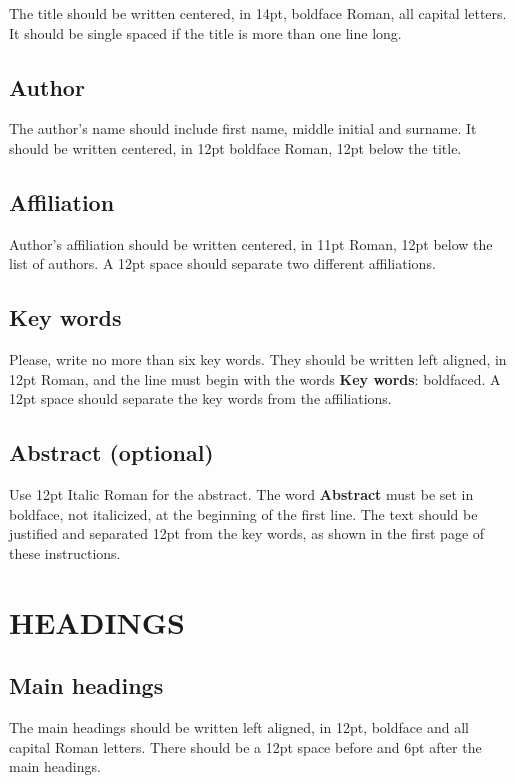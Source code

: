 \documentclass{wccm2024}
\begin{document}
The title should be written centered, in 14pt, boldface Roman, all
capital letters. It should be single spaced if the title is more
than one line long.

\subsection{Author}

The author's name should include first name, middle initial and
surname. It should be written centered, in 12pt boldface Roman,
12pt below the title.

\subsection{Affiliation}

Author's affiliation should be written centered, in 11pt Roman,
12pt below the list of authors. A 12pt space should separate two
different affiliations.

\subsection{Key words}

Please, write no more than six key words. They should be written
left aligned, in 12pt Roman, and the line must begin with the
words {\bf Key words}: boldfaced. A 12pt space should separate the
key words from the affiliations.

\subsection {Abstract (optional)}

Use 12pt Italic Roman for the abstract. The word {\bf Abstract} must
be set in boldface, not italicized, at the beginning of the first
line. The text should be justified and separated 12pt from the key
words, as shown in the first page of these instructions.

\section{HEADINGS}

\subsection{Main headings}

The main headings should be written left aligned, in 12pt,
boldface and all capital Roman letters. There should be a 12pt
space before and 6pt after the main headings.
\end{document}
